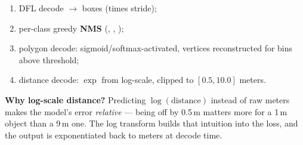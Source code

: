 \begin{enumerate}[leftmargin=1.4em,itemsep=1pt]
  \item DFL decode $\rightarrow$  boxes (times stride);
  \item per-class greedy \textbf{NMS} (, ,
        );
  \item polygon decode:  sigmoid/softmax-activated, vertices
        reconstructed for bins above threshold;
  \item distance decode: $\exp$ from log-scale, clipped to $[0.5, 10.0]$ meters.
\end{enumerate}

\begin{teacher}
\textbf{Why log-scale distance?} Predicting $\log(\text{distance})$ instead of raw meters
makes the model's error \emph{relative} --- being off by 0.5\,m matters more for a 1\,m
object than a 9\,m one. The log transform builds that intuition into the loss, and the
output is exponentiated back to meters at decode time.
\end{teacher}

